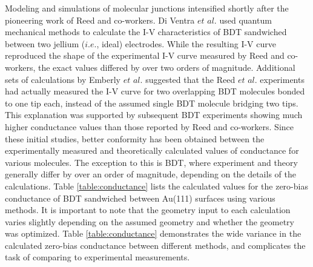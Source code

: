 \documentclass[10pt]{report}  %
\begin{document}
Modeling and simulations of molecular junctions intensified shortly after the pioneering work of Reed and co-workers.\cite{Reed:1997} Di Ventra $et$ $al.$ \cite{DiVentra:2000} used quantum mechanical methods to calculate the I-V characteristics of BDT sandwiched between two jellium ($i.e.$, ideal) electrodes. While the resulting I-V curve reproduced the shape of the experimental I-V curve measured by Reed and co-workers, \cite{Reed:1997} the exact values differed by over two orders of magnitude. Additional sets of calculations by Emberly $et$ $al.$ \cite{Emberly:2001} suggested that the Reed $et$ $al.$ \cite{Reed:1997} experiments had actually measured the I-V curve for two overlapping BDT molecules bonded to one tip each, instead of the assumed single BDT molecule bridging two tips. This explanation was supported by subsequent BDT experiments \cite{Xiao:2004,Tsutsui:2009} showing much higher conductance values than those reported by Reed and co-workers.\cite{Reed:1997} Since these initial studies, better conformity has been obtained between the experimentally measured and theoretically calculated values of conductance for various molecules. \cite{Lindsay:2007} The exception to this is BDT, where experiment and theory generally differ by over an order of magnitude,\cite{Lindsay:2007} depending on the details of the calculations. Table \ref{table:conductance} lists the calculated values for the zero-bias conductance of BDT sandwiched between Au(111) surfaces using various methods. It is important to note that the geometry input to each calculation varies slightly depending on the assumed geometry and whether the geometry was optimized. Table \ref{table:conductance} demonstrates the wide variance in the calculated zero-bias conductance between different methods, and complicates the task of comparing to experimental measurements.
\end{document}
